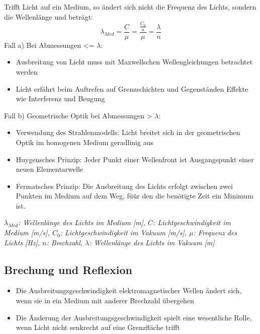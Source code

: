 \documentclass[a4paper,10pt]{article}
\newenvironment{displayformula}
{
	\begin{framed}
		\color{formulaColor}
	}
	{\end{framed}}
\newcommand{\formulalegend}[1]{%
	\par\vspace{0.5ex}%
	{{\color{legendColor}\RaggedRight\small\textit{#1}}}%
	\par\vspace{1.5ex}%
}
\begin{document}
\begin{displayformula}
	Trifft Licht auf ein Medium, so ändert sich nicht die Frequenz des Lichts, sondern die Wellenlänge und beträgt:
	\[
	\lambda_{Med} = \frac{C}{\mu} = \frac{\frac{C_0}{n}}{\mu} = \frac{\lambda}{n}
	\]
	Fall a) Bei Abmessungen <= $\lambda$: \\
	\begin{itemize}
		\item Ausbreitung von Licht muss mit Maxwellschen Wellengleichungen betrachtet werden 
		\item Licht erfährt beim Auftrefen auf Grenzschichten und Gegenständen Effekte wie Interferenz und Beugung \\
	\end{itemize}
	
	Fall b) Geometrische Optik bei Abmessungen > $\lambda$: \\
	\begin{itemize}
		\item Verwendung des Strahlenmodells: Licht breitet sich in der geometrischen Optik im homogenen Medium geradlinig aus 
		\item Huygensches Prinzip: Jeder Punkt einer Wellenfront ist Ausgangspunkt einer neuen Elementarwelle
		\item Fermatsches Prinzip: Die Ausbreitung des Lichts erfolgt zwischen zwei Punkten im Medium auf dem Weg, füür den die benötigte Zeit ein Minimum ist.
	\end{itemize}

\end{displayformula}
\formulalegend{
	\( \lambda_{Med} \): Wellenlänge des Lichts im Medium [m], 
	\( C \): Lichtgeschwindigkeit im Medium [m/s], 
	\( C_0 \): Lichtgeschwindigkeit im Vakuum [m/s], 
	\( \mu \): Frequenz des Lichts [Hz], 
	\( n \): Brechzahl, 
	\( \lambda \): Wellenlänge des Lichts im Vakuum [m]
}


\subsection{Brechung und Reflexion}

\begin{displayformula}
	\begin{itemize}
		\item Die Ausbreitungsgeschwindigkeit elektromagnetischer Wellen ändert sich, wenn sie in ein Medium mit anderer Brechzahl übergehen
		\item Die Änderung der Ausbreitungsgeschwindigkeit spielt eine wesentliche Rolle, wenn Licht nicht senkrecht auf eine Grenzfläche trifft
	\end{itemize}
\end{displayformula}
\end{document}
